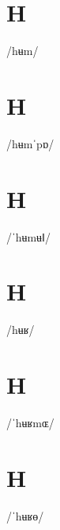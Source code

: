 \documentclass[10pt,a4paper,twoside]{book}
\begin{document}
\section*{H}

\begin{multicols}{3}
 {/hʉm/} {}
\end{multicols}

\section*{H}

\begin{multicols}{3}
 {/hʉmˈpɒ/} {}
\end{multicols}

\section*{H}

\begin{multicols}{3}
 {/ˈhʉmʉǁ/} {}
\end{multicols}

\section*{H}

\begin{multicols}{3}
 {/hʉʁ/} {}
\end{multicols}

\section*{H}

\begin{multicols}{3}
 {/ˈhʉʁmɶ/} {}
\end{multicols}

\section*{H}

\begin{multicols}{3}
 {/ˈhʉʁɵ/} {}
\end{multicols}
\end{document}
